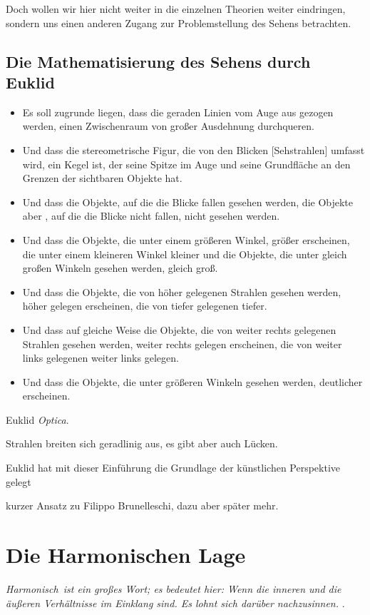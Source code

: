 \documentclass[12pt,a4paper]{article}
\begin{document}
Doch wollen wir hier nicht weiter in die einzelnen Theorien weiter eindringen, sondern uns einen anderen Zugang zur Problemstellung des Sehens betrachten.

\subsection{Die Mathematisierung des Sehens durch Euklid} 

\begin{itemize}
\item Es soll zugrunde liegen, dass die geraden Linien vom Auge aus gezogen werden, einen Zwischenraum von großer Ausdehnung durchqueren.
\item Und dass die stereometrische Figur, die von den Blicken [Sehstrahlen] umfasst wird, ein Kegel ist, der seine Spitze im Auge und seine Grundfläche an den Grenzen der sichtbaren Objekte hat.
\item Und dass die Objekte, auf die die Blicke fallen gesehen werden, die Objekte aber , auf die die Blicke nicht fallen, nicht gesehen werden.
\item Und dass die Objekte, die unter einem größeren Winkel, größer erscheinen, die unter einem kleineren Winkel kleiner und die Objekte, die unter gleich großen Winkeln gesehen werden, gleich groß.
\item Und dass die Objekte, die von höher gelegenen Strahlen gesehen werden, höher gelegen erscheinen, die von tiefer gelegenen tiefer.
\item Und dass auf gleiche Weise die Objekte, die von weiter rechts gelegenen Strahlen gesehen werden, weiter rechts gelegen erscheinen, die von weiter links gelegenen weiter links gelegen.
\item Und dass die Objekte, die unter größeren Winkeln gesehen werden, deutlicher erscheinen.
\end{itemize}
Euklid \textit{Optica}.

Strahlen breiten sich geradlinig aus, es gibt aber auch Lücken.

Euklid hat mit dieser Einführung die Grundlage der künstlichen Perspektive gelegt

kurzer Ansatz zu Filippo Brunelleschi, dazu aber später mehr.

\newpage
\section{Die Harmonischen Lage}
\label{subsec:dieHarmonischeLage}
\textit{\glqq Harmonisch\grqq ~ist ein großes Wort; es bedeutet hier: Wenn die inneren und die äußeren Verhältnisse im Einklang sind. Es lohnt sich darüber nachzusinnen.} \citep[S.~53]{projektiveGeometrie}.
\end{document}
